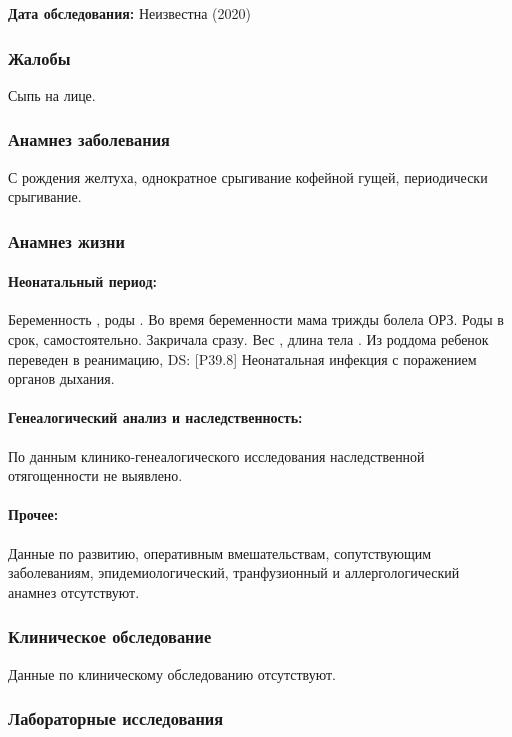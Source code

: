 \documentclass[a4paper,14pt]{extarticle}
\newcommand{\gramm}{г}
\newcommand{\cm}{см}
\newcommand{\DS}[2]{[#2] #1}
\begin{document}
\textbf{Дата обследования:} Неизвестна (2020)

\subsubsection*{Жалобы}

Сыпь на лице.

\subsubsection*{Анамнез заболевания}

С рождения желтуха, однократное срыгивание кофейной гущей, периодически срыгивание.

\subsubsection*{Анамнез жизни}

\paragraph{Неонатальный период:}
Беременность , роды .
Во время беременности мама трижды болела ОРЗ.
Роды в срок, самостоятельно.
Закричала сразу.
Вес \numprint[\gramm]{2940}, длина тела \numprint[\cm]{49}.
Из роддома ребенок переведен в реанимацию, DS: \DS{Неонатальная инфекция с поражением органов дыхания}{P39.8}.

\paragraph{Генеалогический анализ и наследственность:} По данным клинико\hyp{}генеалогического исследования наследственной отягощенности не выявлено.

\paragraph{Прочее:} Данные по развитию, оперативным вмешательствам, сопутствующим заболеваниям, эпидемиологический, транфузионный и аллергологический анамнез отсутствуют.

\subsubsection*{Клиническое обследование}

Данные по клиническому обследованию отсутствуют.

\subsubsection*{Лабораторные исследования}
\end{document}
